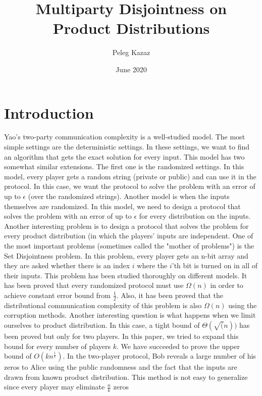 \documentclass{article}
\title{Multiparty Disjointness on Product Distributions}
\author{Peleg Kazaz}
\date{June 2020}
\theoremstyle{plain}
\begin{document}
\maketitle


\section{Introduction}
Yao's two-party communication complexity is a well-studied model. The most simple settings are the deterministic settings. In these settings, we want to find an algorithm that gets the exact solution for every input. This model has two somewhat similar extensions. The first one is the randomized settings. In this model, every player gets a random string (private or public) and can use it in the protocol. In this case, we want the protocol to solve the problem with an error of up to $\epsilon$ (over the randomized strings). \newline
Another model is when the inputs themselves are randomized. In this model, we need to design a protocol that solves the problem with an error of up to $\epsilon$ for every distribution on the inputs. Another interesting problem is to design a protocol that solves the problem for every product distribution (in which the players' inputs are independent. \newline
One of the most important problems (sometimes called the "mother of problems") is the Set Disjointness problem. In this problem, every player gets an n-bit array and they are asked whether there is an index $i$ where the $i$'th bit is turned on in all of their inputs. \newline
This problem has been studied thoroughly on different models. It has been proved that every randomized protocol must use $\Omega(n)$ in order to achieve constant error bound from $\frac{1}{2}$.  Also, it has been proved that the distributional communication complexity of this problem is also $\Omega(n)$ using the corruption methods. Another interesting question is what happens when we limit ourselves to product distribution. In this case, a tight bound of $\Theta(\sqrt(n))$ has been proved but only for two players. \newline
In this paper, we tried to expand this bound for every number of players $k$. We have succeeded to prove the upper bound of $O(kn^{\frac{1}{k}})$. 
In the two-player protocol, Bob reveals a large number of his zeros to Alice using the public randomness and the fact that the inputs are drawn from known product distribution. This method is not easy to generalize since every player may eliminate $\frac{n}{k}$ zeros 
\end{document}
